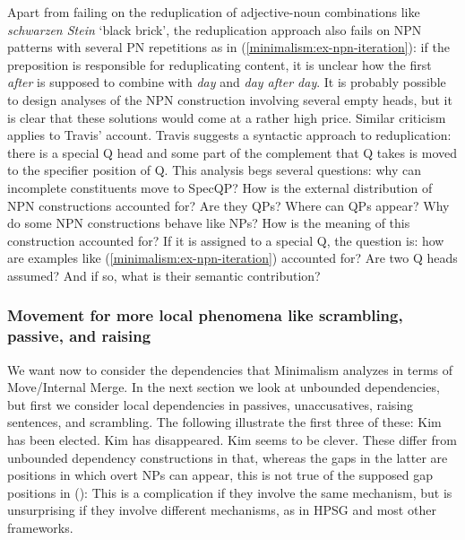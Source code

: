 \documentclass[output=paper
 	        ,biblatex
                ,babelshorthands
                ,newtxmath
                ,draftmode
                ,colorlinks, citecolor=brown
]{langscibook}
\begin{document}
\begin{sloppypar}
Apart from failing on the reduplication of adjective-noun combinations like \emph{schwar\-zen Stein}
`black brick', the reduplication approach also fails on NPN patterns with several PN repetitions as
in (\ref{minimalism:ex-npn-iteration}): if the preposition is responsible for reduplicating content, it is
unclear how the first \emph{after} is supposed to combine with \emph{day} and \emph{day after
  day}. It is probably possible to design analyses of the NPN construction involving
several empty heads, but it is clear that these solutions would come at a rather high price. Similar
criticism applies to Travis' \citeyearpar{Travis2003a} account. Travis suggests a syntactic approach
to reduplication: there is a special Q head and some part of the complement that Q takes is moved to
the specifier position of Q. This analysis begs several questions: why can incomplete constituents
move to SpecQP? How is the external distribution of NPN constructions accounted for? Are they QPs?
Where can QPs appear? Why do some NPN constructions behave like NPs? How is the meaning of this construction accounted
for? If it is assigned to a special Q, the question is: how are examples like
(\ref{minimalism:ex-npn-iteration}) accounted for? Are two Q heads assumed? And if so, what is their
semantic contribution?
\end{sloppypar}


\subsubsection{Movement for more local phenomena like scrambling, passive, and raising}
\label{sec-passive-raising-minimalism}

We want now to consider the dependencies that Minimalism analyzes in terms of Move/Internal
Merge. In the next section we look at unbounded dependencies, but first we consider local
dependencies in passives, unaccusatives, raising sentences, and scrambling. The following illustrate
the first three of these:
\eal\label{ex:min-kim-has-seems}
\ex Kim has been elected.
\ex Kim has disappeared.
\ex Kim seems to be clever.
\zl
These differ from unbounded dependency constructions in that, whereas the gaps in the latter are
positions in which overt NPs can appear, this is not true of the supposed gap positions in ():
\eal
{}
\zl 
This is a complication if they involve the same mechanism, but is unsurprising if they involve
different mechanisms, as in HPSG and most other frameworks.
\end{document}
